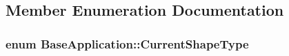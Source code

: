 \subsection{Member Enumeration Documentation}
\hypertarget{class_base_application_abc714ee35568ef8090a07419fd391ba7}{
\subsubsection[{Current\-Shape\-Type}]{\setlength{\rightskip}{0pt plus 5cm}enum {\bf Base\-Application\-::\-Current\-Shape\-Type}\hspace{0.3cm}{\ttfamily [protected]}}}\label{class_base_application_abc714ee35568ef8090a07419fd391ba7}
